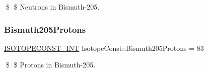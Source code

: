 \$ \$ Neutrons in Bismuth-\/205. \mbox{\label{group___isotope_const-_bismuth-_bi205_ga361404f9fd95f0639941bbacbfd2523f}} 
\subsubsection{\texorpdfstring{Bismuth205\+Protons}{Bismuth205Protons}}
{\footnotesize\ttfamily \mbox{\hyperlink{group___isotope_const-_macros_ga5f18360b3e99483a35c32d789e62621c}{I\+S\+O\+T\+O\+P\+E\+C\+O\+N\+S\+T\+\_\+\+I\+NT}} Isotope\+Const\+::\+Bismuth205\+Protons = 83}

\$ \$ Protons in Bismuth-\/205. 